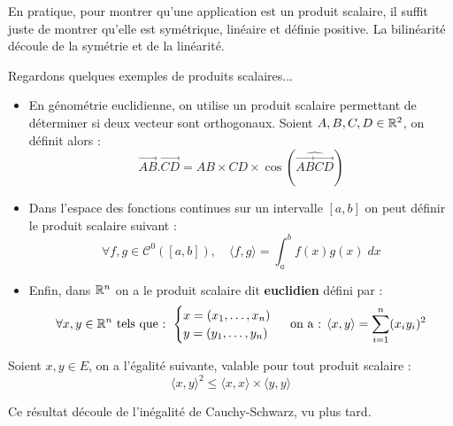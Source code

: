 \begin{remark}
    En pratique, pour montrer qu'une application est un produit scalaire, il suffit juste de montrer qu'elle est symétrique, 
    linéaire et définie positive. La bilinéarité découle de la symétrie et de la linéarité.  
\end{remark}

\begin{example}
    Regardons quelques exemples de produits scalaires...
    \begin{itemize}
        \item En génométrie euclidienne, on utilise un produit scalaire permettant de déterminer si deux vecteur sont 
        orthogonaux. Soient $A,B,C,D \in \mathbb{R}^2$, on définit alors :
            \[ \vec{AB}.\vec{CD} = AB \times CD \times \cos (\widehat{\vec{AB}\vec{CD}}) \]
        \item Dans l'espace des fonctions continues sur un intervalle $[a,b]$ on peut définir le produit scalaire suivant :
            \[ \forall f,g \in \mathcal{C}^0([a,b]), \quad \langle f,g \rangle = \int_{a}^{b} f(x)g(x) \; dx \] 
        \item Enfin, dans $\mathbb{R}^n$ on a le produit scalaire dit \textbf{euclidien} défini par : 
            \[ \forall x,y \in \mathbb{R}^n \text{ tels que : }
                \begin{cases}
                    x = (x_1, \dots, x_n) \\ 
                    y = (y_1, \dots, y_n)
                \end{cases}
                \text{ on a  : }
                \langle x,y \rangle = \sum_{i=1}^n (x_i y_i)^2 
            \] 
    \end{itemize}
\end{example}

\begin{prop}
    Soient $x,y \in E$, on a l'égalité suivante, valable pour tout produit scalaire :
        \[ \boxed{ \langle x,y \rangle ^2 \leq \langle x,x \rangle \times \langle y,y \rangle } \] 
\end{prop}

\begin{remark}
    Ce résultat découle de l'inégalité de Cauchy-Schwarz, vu plus tard. 
\end{remark}




